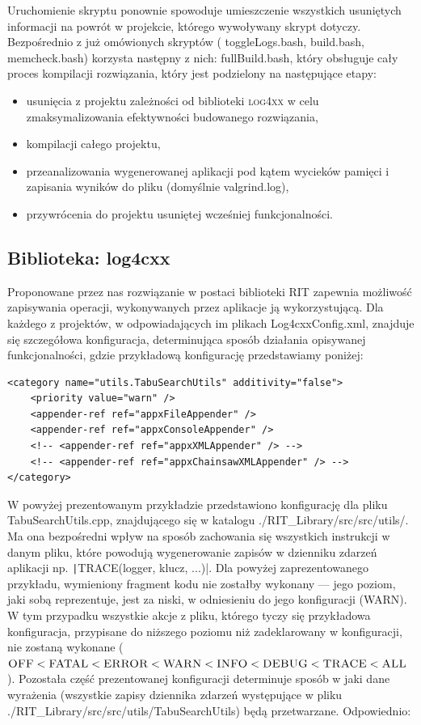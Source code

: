 Uruchomienie skryptu ponownie spowoduje umieszczenie wszystkich usuniętych informacji na powrót w projekcie, którego wywoływany skrypt dotyczy. Bezpośrednio z już omówionych skryptów ( \textsf{toggleLogs.bash}, \textsf{build.bash}, \textsf{memcheck.bash}) korzysta następny z nich: \textsf{fullBuild.bash}, który obsługuje cały proces kompilacji rozwiązania, który jest podzielony na następujące etapy:
\begin{itemize}
	\item usunięcia z projektu zależności od biblioteki \textsc{log4xx} w celu zmaksymalizowania efektywności budowanego rozwiązania,
	\item kompilacji całego projektu,
	\item przeanalizowania wygenerowanej aplikacji pod kątem wycieków pamięci i zapisania wyników do pliku (domyślnie \textsf{valgrind.log}),
	\item przywrócenia do projektu usuniętej wcześniej funkcjonalności.
\end{itemize}

\subsection{Biblioteka: log4cxx}

Proponowane przez nas rozwiązanie w postaci biblioteki RIT zapewnia możliwość zapisywania operacji, wykonywanych przez aplikacje ją wykorzystującą. Dla każdego z projektów, w odpowiadających im plikach Log4cxxConfig.xml, znajduje się szczegółowa konfiguracja, determinująca sposób działania opisywanej funkcjonalności, gdzie przykładową konfigurację przedstawiamy poniżej:

\begin{verbatim}
<category name="utils.TabuSearchUtils" additivity="false">
	<priority value="warn" />
	<appender-ref ref="appxFileAppender" />
	<appender-ref ref="appxConsoleAppender" />
	<!-- <appender-ref ref="appxXMLAppender" /> -->
	<!-- <appender-ref ref="appxChainsawXMLAppender" /> -->
</category>
\end{verbatim}

W powyżej prezentowanym przykładzie przedstawiono konfigurację dla pliku \textsf{TabuSearchUtils.cpp}, znajdującego się w katalogu \textsf{./RIT\_Library/src/src/utils/}. Ma ona bezpośredni wpływ na sposób zachowania się wszystkich instrukcji w danym pliku, które powodują wygenerowanie zapisów w dzienniku zdarzeń aplikacji np. \texttt|TRACE(logger, klucz, ...)|. Dla powyżej zaprezentowanego przykładu, wymieniony fragment kodu nie zostałby wykonany --- jego poziom, jaki sobą reprezentuje, jest za niski, w odniesieniu do jego konfiguracji (\textsc{WARN}). W tym przypadku wszystkie akcje z pliku, którego tyczy się przykładowa konfiguracja, przypisane do niższego poziomu niż zadeklarowany w konfiguracji, nie zostaną wykonane ($\textsc{OFF} < \textsc{FATAL} < \textsc{ERROR} < \textsc{WARN} < \textsc{INFO} < \textsc{DEBUG} < \textsc{TRACE} < \textsc{ALL}$). Pozostała część prezentowanej konfiguracji determinuje sposób w jaki dane wyrażenia (wszystkie zapisy dziennika zdarzeń występujące w pliku \textsf{./RIT\_Library/src/src/utils/TabuSearchUtils}) będą przetwarzane. Odpowiednio:

